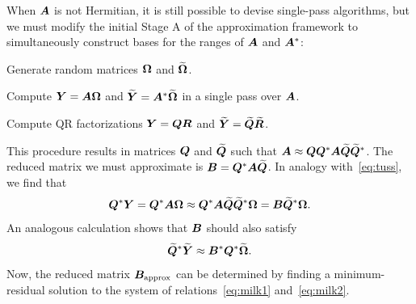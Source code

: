 \documentclass[final]{siamltex}
\newcounter{algorithm}[section]
\begin{document}
When $\bm{A}$ is not Hermitian, it is still possible to devise
single-pass algorithms, but we must modify the initial Stage A
of the approximation framework to simultaneously construct bases
for the ranges of $\bm{A}$ and $\bm{A}^{*}$:
\lsp
\begin{remunerate}
\item   Generate random matrices $\bm{\Omega}$ and $\widetilde{\bm{\Omega}}$.
\item   Compute $\bm{Y} = \bm{A\Omega}$ and
$\widetilde{\bm{Y}} = \bm{A}^{*}\widetilde{\bm{\Omega}}$ in a single pass over $\bm{A}$.
\item   Compute QR factorizations $\bm{Y} = \bm{QR}$ and
$\widetilde{\bm{Y}} = \widetilde{\bm{Q}}\widetilde{\bm{R}}$.
\end{remunerate}
\lsp
This procedure results in matrices $\bm{Q}$ and $\widetilde{\bm{Q}}$ such that
$\bm{A} \approx \bm{QQ}^{*}\bm{A}\widetilde{\bm{Q}}\widetilde{\bm{Q}}^{*}$.
The reduced matrix we must approximate is
$\bm{B} = \bm{Q}^{*}\bm{A}\widetilde{\bm{Q}}$.
In analogy with~\eqref{eq:tuss}, we find that
\begin{equation}
\label{eq:milk1}
\mtx{Q}^{\adj}\mtx{Y} =
\mtx{Q}^{\adj}\mtx{A\Omega} \approx
\mtx{Q}^{\adj}\mtx{A}\widetilde{\mtx{Q}}\widetilde{\mtx{Q}}^{\adj}\mtx{\Omega} =
\mtx{B}\widetilde{\mtx{Q}}^{\adj}\mtx{\Omega}.
\end{equation}
An analogous calculation shows that $\bm{B}$ should also satisfy
\begin{equation}
\label{eq:milk2}
\widetilde{\mtx{Q}}^{\adj}\widetilde{\mtx{Y}} \approx \mtx{B}^{\adj}\mtx{Q}^{\adj}\widetilde{\mtx{\Omega}}.
\end{equation}
Now, the reduced matrix $\bm{B}_{\rm approx}$ can be determined by finding a
minimum-residual solution to the system of relations~\eqref{eq:milk1} and~\eqref{eq:milk2}.

\lsp
\end{document}
